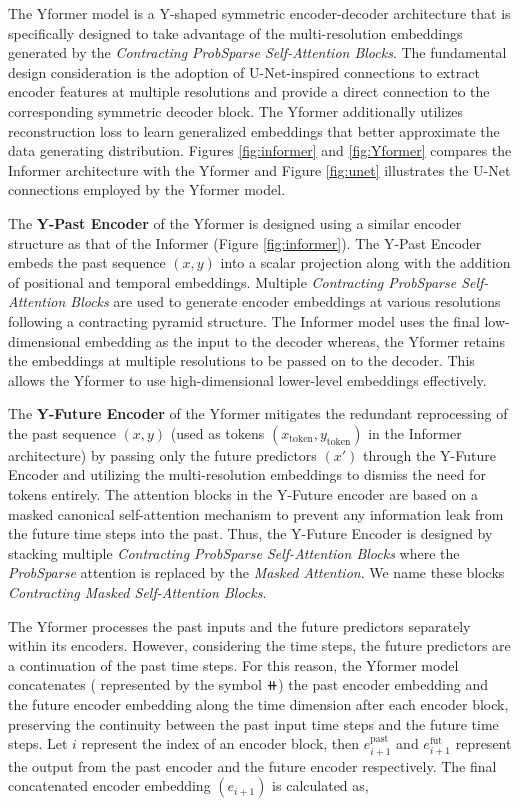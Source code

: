 The Yformer model is a Y-shaped symmetric encoder-decoder architecture that is specifically designed to take advantage of the multi-resolution embeddings generated by the \textsl{Contracting ProbSparse Self-Attention Blocks}. The fundamental design consideration is the adoption of U-Net-inspired connections to extract encoder features at multiple resolutions and provide a direct connection to the corresponding symmetric decoder block. The Yformer additionally utilizes reconstruction loss to learn generalized embeddings that better approximate the data generating distribution. Figures \ref{fig:informer} and \ref{fig:Yformer} compares the Informer architecture with the Yformer and Figure \ref{fig:unet} illustrates the U-Net connections employed by the Yformer model.

The \textbf{Y-Past Encoder} of the Yformer is designed using a similar encoder structure as that of the Informer (Figure \ref{fig:informer}). The Y-Past Encoder embeds the past sequence $(x, y)$ into a scalar projection along with the addition of positional and temporal embeddings. Multiple \textsl{Contracting ProbSparse Self-Attention Blocks} are used to generate encoder embeddings at various resolutions following a contracting pyramid structure. The Informer model uses the final low-dimensional embedding as the input to the decoder whereas, the Yformer retains the embeddings at multiple resolutions to be passed on to the decoder. This allows the Yformer to use high-dimensional lower-level embeddings effectively.

The \textbf{Y-Future Encoder} of the Yformer mitigates the redundant reprocessing of the past sequence $(x,y)$ (used as tokens $(x_{\text{token}}, y_{\text{token}})$ in the Informer architecture) by passing only the future predictors $(x')$ through the Y-Future Encoder and utilizing the multi-resolution embeddings to dismiss the need for tokens entirely. The attention blocks in the Y-Future encoder are based on a masked canonical self-attention mechanism \cite{vaswani2017attention} to prevent any information leak from the future time steps into the past. Thus, the Y-Future Encoder is designed by stacking multiple \textsl{Contracting ProbSparse Self-Attention Blocks} where the \textsl{ProbSparse} attention is replaced by the \textsl{Masked Attention}. We name these blocks \textsl{Contracting Masked Self-Attention Blocks}.

The Yformer processes the past inputs and the future predictors separately within its encoders. However, considering the time steps, the future predictors are a continuation of the past time steps. For this reason, the Yformer model concatenates ( represented by the symbol $\doubleplus$) the past encoder embedding and the future encoder embedding along the time dimension after each encoder block, preserving the continuity between the past input time steps and the future time steps. Let $i$ represent the index of an encoder block, then $e^{\text{past}}_{i+1}$ and $e^{\text{fut}}_{i+1}$ represent the output from the past encoder and the future encoder respectively. The final concatenated encoder embedding $(e_{i+1})$ is calculated as, 

